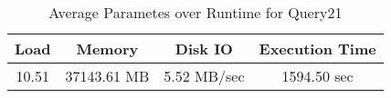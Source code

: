 \documentclass[../../main.tex]{subfiles}
\begin{document}
\begin{minipage}{.5\textwidth}
    \end{minipage}
    \begin{table}
        \begin{center}
            \begin{tabular}{ |c|c|c|c| } 
            \hline
            Load & Memory & Disk IO & Execution Time\\
            \hline
            10.51 & 37143.61 MB & 5.52 MB/sec & 1594.50 sec \\
            \hline
            \end{tabular}
            \\[1pt]
            \caption{Average Parametes over Runtime for Query21}
        \end{center}
    \end{table}
    \pagebreak
\end{document}
